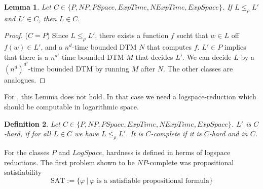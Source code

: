 \documentclass{report}
\newcommand{\LogSpace}{\text{$\mathit{LogSpace}$}\xspace}
\newtheorem{definition}{Definition}[chapter]
\newtheorem{lemma}[definition]{Lemma}
\begin{document}
\begin{lemma} Let $C \in \{P,NP,PSpace,ExpTime,NExpTime,ExpSpace\}$. If $L\leq_\rho L'$ and $L'\in C$, then $L \in C$.
\end{lemma}
\begin{proof} ($C=P$) Since $L\leq_\rho L'$, there exists a function $f$ sucht that $w\in L$ off $f(w)\in L'$, and a $n^d$-time bounded DTM $N$ that computes $f$. $L'\in P$ implies that there is a $n^{d'}$-time bounded DTM $M$ that decides $L'$. We can decide $L$ by a $(n^d)^{d'}$-time bounded DTM by running $M$ after $N$. The other classes are analogues.
\end{proof}

For \LogSpace, this Lemma does not hold. In that case we need a logspace-reduction which should be computable in logarithmic space.

\begin{definition}Let $C\in\{P,NP,PSpace,ExpTime,NExpTime,ExpSpace\}$. $L'$ is $C$-hard, if for all $L\in C$ we have $L\leq_\rho L'$. It is $C$-complete if it is $C$-hard and in $C$.
\end{definition}
For the classes $P$ and $LogSpace$, hardness is defined in herms of logspace reductions. The first problem shown to be $NP$-complete was propositional satisfiability
\[ \mathrm{SAT} := \{\varphi\ |\ \varphi \text{ is a satisfiable propositional formula}\} \]
\end{document}
